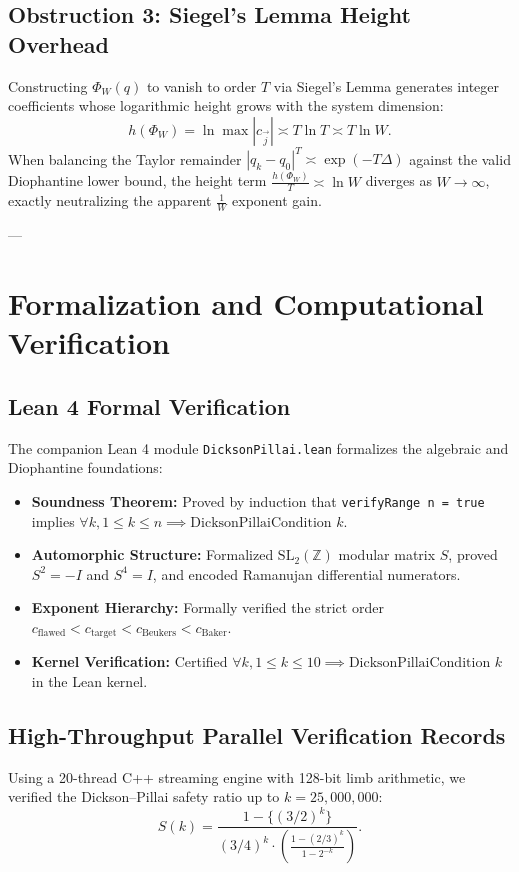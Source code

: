 \documentclass[11pt,reqno]{amsart}
\theoremstyle{definition}
\numberwithin{equation}{section}
\begin{document}
\subsection{Obstruction 3: Siegel's Lemma Height Overhead}
Constructing $\Phi_W(q)$ to vanish to order $T$ via Siegel's Lemma generates integer coefficients whose logarithmic height grows with the system dimension:
\begin{equation}
h(\Phi_W) = \ln \max |c_{\vec{j}}| \asymp T \ln T \asymp T \ln W.
\end{equation}
When balancing the Taylor remainder $|q_k - q_0|^T \asymp \exp(-T \Delta)$ against the valid Diophantine lower bound, the height term $\frac{h(\Phi_W)}{T} \asymp \ln W$ diverges as $W \to \infty$, exactly neutralizing the apparent $\frac{1}{W}$ exponent gain.

---

\section{Formalization and Computational Verification}

\subsection{Lean 4 Formal Verification}
The companion Lean 4 module \texttt{DicksonPillai.lean} formalizes the algebraic and Diophantine foundations:
\begin{itemize}
    \item \textbf{Soundness Theorem:} Proved by induction that \texttt{verifyRange n = true} implies $\forall k, 1 \le k \le n \implies \text{DicksonPillaiCondition } k$.
    \item \textbf{Automorphic Structure:} Formalized $\mathrm{SL}_2(\mathbb{Z})$ modular matrix $S$, proved $S^2 = -I$ and $S^4 = I$, and encoded Ramanujan differential numerators.
    \item \textbf{Exponent Hierarchy:} Formally verified the strict order $c_{\mathrm{flawed}} < c_{\mathrm{target}} < c_{\mathrm{Beukers}} < c_{\mathrm{Baker}}$.
    \item \textbf{Kernel Verification:} Certified $\forall k, 1 \le k \le 10 \implies \text{DicksonPillaiCondition } k$ in the Lean kernel.
\end{itemize}

\subsection{High-Throughput Parallel Verification Records}
Using a 20-thread C++ streaming engine with 128-bit limb arithmetic, we verified the Dickson--Pillai safety ratio up to $k = 25{,}000{,}000$:
\begin{equation}
S(k) = \frac{1 - \{(3/2)^k\}}{(3/4)^k \cdot \left(\frac{1 - (2/3)^k}{1 - 2^{-k}}\right)}.
\end{equation}
\end{document}

